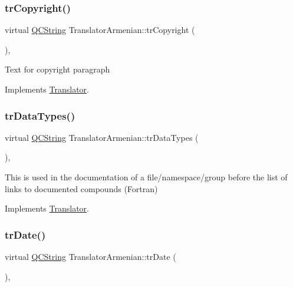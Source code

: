 \subsubsection{\texorpdfstring{trCopyright()}{trCopyright()}}
{\footnotesize\ttfamily virtual \mbox{\hyperlink{class_q_c_string}{Q\+C\+String}} Translator\+Armenian\+::tr\+Copyright (\begin{DoxyParamCaption}{ }\end{DoxyParamCaption})\hspace{0.3cm}{\ttfamily [inline]}, {\ttfamily [virtual]}}

Text for copyright paragraph 

Implements \mbox{\hyperlink{class_translator}{Translator}}.

\mbox{\label{class_translator_armenian_a712962e83e1997c9d9e021549274445d}} 
\subsubsection{\texorpdfstring{trDataTypes()}{trDataTypes()}}
{\footnotesize\ttfamily virtual \mbox{\hyperlink{class_q_c_string}{Q\+C\+String}} Translator\+Armenian\+::tr\+Data\+Types (\begin{DoxyParamCaption}{ }\end{DoxyParamCaption})\hspace{0.3cm}{\ttfamily [inline]}, {\ttfamily [virtual]}}

This is used in the documentation of a file/namespace/group before the list of links to documented compounds (Fortran) 

Implements \mbox{\hyperlink{class_translator}{Translator}}.

\mbox{\label{class_translator_armenian_a28bfca9184c3792d63a13002ba41ce70}} 
\subsubsection{\texorpdfstring{trDate()}{trDate()}}
{\footnotesize\ttfamily virtual \mbox{\hyperlink{class_q_c_string}{Q\+C\+String}} Translator\+Armenian\+::tr\+Date (\begin{DoxyParamCaption}{ }\end{DoxyParamCaption})\hspace{0.3cm}{\ttfamily [inline]}, {\ttfamily [virtual]}}

